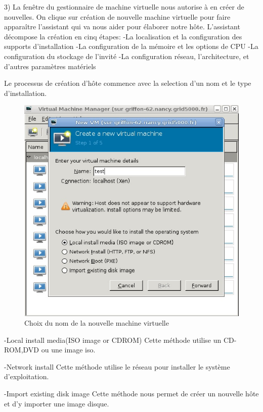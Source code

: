 3) La fenêtre du gestionnaire de machine virtuelle nous autorise à en créer de nouvelles.
On clique sur création de nouvelle machine virtuelle pour faire apparaître l'assistant qui va nous aider pour élaborer notre hôte.
L'assistant décompose la création en cinq étapes:
-La localisation et la configuration des supports d'installation
-La configuration de la mémoire et les options de CPU
-La configuration du stockage de l'invité
-La configuration réseau, l'architecture, et d'autres paramètres matériels

Le processus de création d'hôte commence avec la selection d'un nom et le type d'installation.
\begin{figure}
\begin{center}
\includegraphics[width=350pt]{images/nommachine.jpg}
\end{center}
\caption{Choix du nom de la nouvelle machine virtuelle}
\end{figure}
-Local install media(ISO image or CDROM)
Cette méthode utilise un CD-ROM,DVD ou une image iso.

-Network install
Cette méthode utilise le réseau pour installer le système d'exploitation.

-Import existing disk image
Cette méthode nous permet de créer un nouvelle hôte et d'y importer une image disque.

